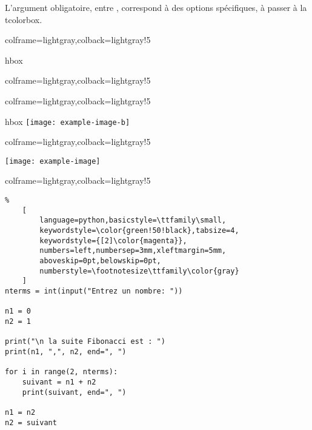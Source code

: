 \documentclass[11pt,a4paper]{ltxdoc}
\begin{document}
\medskip

L'argument obligatoire, entre , correspond à des options spécifiques, à passer à la \textsf{tcolorbox}.

\begin{tcblisting}{colframe=lightgray,colback=lightgray!5}
\begin{VisionnPDF}{hbox}
%
\end{VisionnPDF}
\end{tcblisting}

\begin{tcblisting}{colframe=lightgray,colback=lightgray!5}
\begin{VisionnPDF}[Largeur=14cm,Icones=false]{}
\end{VisionnPDF}
\end{tcblisting}

\begin{tcblisting}{colframe=lightgray,colback=lightgray!5}
\begin{VisionnIMG}[Icones=false]{hbox}
\texttt{[image: example-image-b]}
\end{VisionnIMG}
\end{tcblisting}

\begin{tcblisting}{colframe=lightgray,colback=lightgray!5}
\begin{VisionnIMG}[Largeur=12cm]{}
\texttt{[image: example-image]}
\end{VisionnIMG}
\end{tcblisting}

\begin{tcblisting}{colframe=lightgray,colback=lightgray!5}
\begin{VisionnPY}[Largeur=12cm]{}
\begin{lstlisting}%
    [
        language=python,basicstyle=\ttfamily\small,
        keywordstyle=\color{green!50!black},tabsize=4,
        keywordstyle={[2]\color{magenta}},
        numbers=left,numbersep=3mm,xleftmargin=5mm,
        aboveskip=0pt,belowskip=0pt,
        numberstyle=\footnotesize\ttfamily\color{gray}
    ]
nterms = int(input("Entrez un nombre: "))

n1 = 0
n2 = 1

print("\n la suite Fibonacci est : ")
print(n1, ",", n2, end=", ")

for i in range(2, nterms):
    suivant = n1 + n2
    print(suivant, end=", ")

n1 = n2
n2 = suivant
\end{lstlisting}
\end{VisionnPY}
\end{tcblisting}
\end{document}
